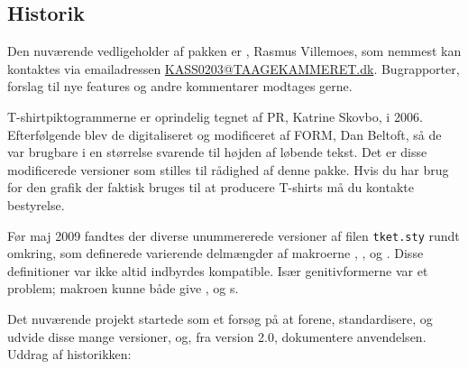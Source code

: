 \documentclass[a4paper,article,oneside,danish]{memoir}
\newcommand{\emaillink}[1]{\href{mailto:#1}{#1}}
\newcommand{\filnavn}[1]{\texttt{#1}}
\begin{document}
\subsection{Historik}
\label{sec:historik}

Den nuværende vedligeholder af pakken er \KASS, Rasmus
Villemoes, som nemmest kan kontaktes via emailadressen
\emaillink{KASS0203@TAAGEKAMMERET.dk}. Bugrapporter, forslag til nye
features og andre kommentarer modtages gerne.

T-shirtpiktogrammerne er oprindelig tegnet af PR,
Katrine Skovbo, i 2006. Efterfølgende blev de digitaliseret og
modificeret af FORM, Dan Beltoft, så de var brugbare i
en størrelse svarende til højden af løbende tekst. Det er disse
modificerede versioner som stilles til rådighed af denne pakke. Hvis
du har brug for den grafik der faktisk bruges til at producere
T-shirts må du kontakte \TKETs bestyrelse.

Før maj 2009 fandtes der diverse unummererede versioner af filen
\filnavn{tket.sty} rundt omkring, som definerede varierende delmængder
af makroerne , ,  og . Disse
definitioner var ikke altid indbyrdes kompatible. Især genitivformerne
var et problem; makroen  kunne både give \TKETS, \TKETs og
\TKET{}s.

Det nuværende projekt startede som et forsøg på at forene,
standardisere, og udvide disse mange versioner, og, fra version 2.0,
dokumentere anvendelsen. Uddrag af historikken:
\end{document}
